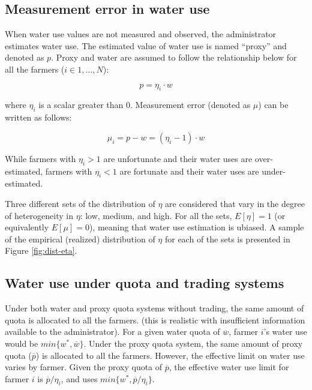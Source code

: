 \documentclass[
]{article}
\begin{document}
\subsection{Measurement error in water use}\label{measurement-error-in-water-use}

When water use values are not measured and observed, the administrator estimates water use. The estimated value of water use is named ``proxy'' and denoted as \(p\). Proxy and water are assumed to follow the relationship below for all the farmers (\(i \in 1,\dots, N\)):

\begin{equation}
p = \eta_i\cdot w
\end{equation}

where \(\eta_i\) is a scalar greater than 0. Measurement error (denoted as \(\mu\)) can be written as follows:

\begin{equation}
\mu_i = p - w = (\eta_i - 1)\cdot w
\end{equation}

While farmers with \(\eta_i > 1\) are unfortunate and their water uses are over-estimated, farmers with \(\eta_i < 1\) are fortunate and their water uses are under-estimated.

Three different sets of the distribution of \(\eta\) are considered that vary in the degree of heterogeneity in \(\eta\): low, medium, and high. For all the sets, \(E[\eta] = 1\) (or equivalently \(E[\mu] = 0\)), meaning that water use estimation is ubiased. A sample of the empirical (realized) distribution of \(\eta\) for each of the sets is presented in Figure \ref{fig:dist-eta}.

\subsection{Water use under quota and trading systems}\label{water-use-under-quota-and-trading-systems}

Under both water and proxy quota systems without trading, the same amount of quota is allocated to all the farmers. (this is realistic with insufficient information available to the administrator). For a given water quota of \(\overline{w}\), farmer \(i\)'s water use would be \(min\{w^*, \overline{w}\}\). Under the proxy quota system, the same amount of proxy quota (\(\overline{p}\)) is allocated to all the farmers. However, the effective limit on water use varies by farmer. Given the proxy quota of \(\overline{p}\), the effective water use limit for farmer \(i\) is \(\overline{p} / \eta_i\), and uses \(min\{w^*, \overline{p} / \eta_i\}\).
\end{document}
